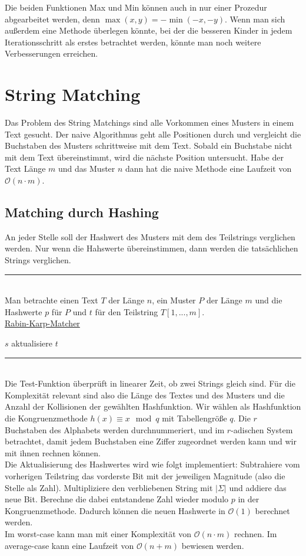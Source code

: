 \documentclass[a4paper, 12pt]{article}
\begin{document}
	Die beiden Funktionen Max und Min können auch in nur einer Prozedur abgearbeitet werden, denn $\max(x,y) = -\min(-x,-y)$. Wenn man sich außerdem eine Methode überlegen könnte, bei der die besseren Kinder in jedem Iterationsschritt als erstes betrachtet werden, könnte man noch weitere Verbesserungen erreichen.
	\section{String Matching} 
	Das Problem des String Matchings sind alle Vorkommen eines Musters in einem Text gesucht. Der naive Algorithmus geht alle Positionen durch und vergleicht die Buchstaben des Musters schrittweise mit dem Text. Sobald ein Buchstabe nicht mit dem Text übereinstimmt, wird die nächste Position untersucht. Habe der Text Länge $m$ und das Muster $n$ dann hat die naive Methode eine Laufzeit von $\mathcal{O}(n\cdot m)$.
	\subsection{Matching durch Hashing}
	An jeder Stelle soll der Hashwert des Musters mit dem des Teilstrings verglichen werden. Nur wenn die Hahswerte übereinstimmen, dann werden die tatsächlichen Strings verglichen.
	\par\noindent\rule{\textwidth}{0.4pt}\\
	Man betrachte einen Text $T$ der Länge $n$, ein Muster $P$ der Länge $m$ und die Hashwerte $p$ für $P$ und $t$ für den Teilstring $T[1,...,m]$.\\
	\underline{Rabin-Karp-Matcher}
	\begin{algorithmic}[1]
		\Return $s$
		\EndIf
		\EndIf
		\State aktualisiere $t$
		\EndIf
		\EndFor
	\end{algorithmic}
	\par\noindent\rule{\textwidth}{0.4pt}\\
	Die Test-Funktion überprüft in linearer Zeit, ob zwei Strings gleich sind. Für die Komplexität relevant sind also die Länge des Textes und des Musters und die Anzahl der Kollisionen der gewählten Hashfunktion. Wir wählen als Hashfunktion die Kongruenzmethode $h(x) \equiv x \mod q$ mit Tabellengröße $q$. Die $r$ Buchstaben des Alphabets werden durchnummeriert, und im $r$-adischen System betrachtet, damit jedem Buchstaben eine Ziffer zugeordnet werden kann und wir mit ihnen rechnen können.\\
	Die Aktualisierung des Hashwertes wird wie folgt implementiert:
	Subtrahiere vom vorherigen Teilstring das vorderste Bit mit der jeweiligen Magnitude (also die Stelle als Zahl). Multipliziere den verbliebenen String mit $\left| \Sigma\right|$ und addiere das neue Bit. Berechne die dabei entstandene Zahl wieder modulo $p$ in der Kongruenzmethode. Dadurch können die neuen Hashwerte in $\mathcal{O}(1)$ berechnet werden.\\
	Im worst-case kann man mit einer Komplexität von $\mathcal{O}(n\cdot m)$ rechnen. Im average-case kann eine Laufzeit von $\mathcal{O}(n+m)$ bewiesen werden.\\
	
\end{document}
